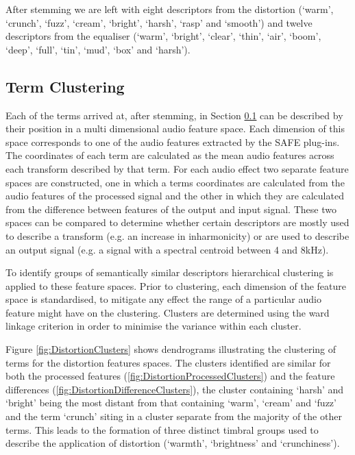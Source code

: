		After stemming we are left with eight descriptors from the distortion (`warm', `crunch', `fuzz', `cream',
		`bright', `harsh', `rasp' and `smooth') and twelve descriptors from the equaliser (`warm', `bright',
		`clear', `thin', `air', `boom', `deep', `full', `tin', `mud', `box' and `harsh').

	\subsection{Term Clustering}
	\label{sec:TimbreEvaluation-Analysis-TermClustering}
		Each of the terms arrived at, after stemming, in Section \ref{sec:TimbreEvaluation-Analysis-TermClustering}
		can be described by their position in a multi dimensional audio feature space. Each dimension of this space
		corresponds to one of the audio features extracted by the SAFE plug-ins. The coordinates of each term are
		calculated as the mean audio features across each transform described by that term. For each audio effect
		two separate feature spaces are constructed, one in which a terms coordinates are calculated from the audio
		features of the processed signal and the other in which they are calculated from the difference between
		features of the output and input signal. These two spaces can be compared to determine whether certain
		descriptors are mostly used to describe a transform (e.g. an increase in inharmonicity) or are used to
		describe an output signal (e.g. a signal with a spectral centroid between 4 and 8kHz).

		To identify groups of semantically similar descriptors hierarchical clustering is applied to these feature
		spaces. Prior to clustering, each dimension of the feature space is standardised, to mitigate any effect
		the range of a particular audio feature might have on the clustering. Clusters are determined using the
		ward linkage criterion in order to minimise the variance within each cluster.

		Figure \ref{fig:DistortionClusters} shows dendrograms illustrating the clustering of terms for the
		distortion features spaces. The clusters identified are similar for both the processed features
		(\ref{fig:DistortionProcessedClusters}) and the feature differences
		(\ref{fig:DistortionDifferenceClusters}), the cluster containing `harsh' and `bright' being the most
		distant from that containing `warm', `cream' and `fuzz' and the term `crunch' siting in a cluster separate
		from the majority of the other terms. This leads to the formation of three distinct timbral groups used to
		describe the application of distortion (`warmth', `brightness' and `crunchiness'). 

